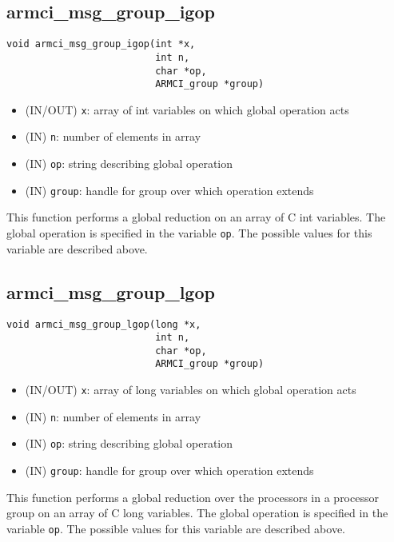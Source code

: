 \documentclass[12pt]{article}
\begin{document}
\subsection{armci\_msg\_group\_igop}
\begin{verbatim}
void armci_msg_group_igop(int *x,
                          int n,
                          char *op,
                          ARMCI_group *group)
\end{verbatim}
\begin{itemize}
\item (IN/OUT) \texttt{x}: array of int variables on which global operation acts
\item (IN) \texttt{n}: number of elements in array
\item (IN) \texttt{op}: string describing global operation
\item (IN) \texttt{group}: handle for group over which operation extends
\end{itemize}
This function performs a global reduction on an array of C int variables. The global
operation is specified in the variable \texttt{op}. The possible values for this
variable are described above.

\subsection{armci\_msg\_group\_lgop}
\begin{verbatim}
void armci_msg_group_lgop(long *x,
                          int n,
                          char *op,
                          ARMCI_group *group)
\end{verbatim}
\begin{itemize}
\item (IN/OUT) \texttt{x}: array of long variables on which global operation acts
\item (IN) \texttt{n}: number of elements in array
\item (IN) \texttt{op}: string describing global operation
\item (IN) \texttt{group}: handle for group over which operation extends
\end{itemize}
This function performs a global reduction over the processors in a processor
group on an array of C long variables. The global
operation is specified in the variable \texttt{op}. The possible values for this
variable are described above.
\end{document}
